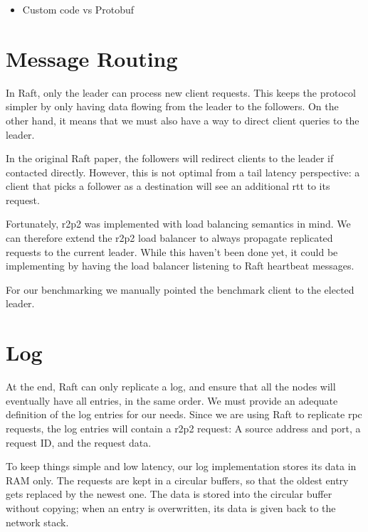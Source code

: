 
\begin{itemize}
    \item Custom code vs Protobuf
\end{itemize}



\section{Message Routing}

In Raft, only the leader can process new client requests.
This keeps the protocol simpler by only having data flowing from the leader to the followers.
On the other hand, it means that we must also have a way to direct client queries to the leader.

In the original Raft paper\cite{raft}, the followers will redirect clients to the leader if contacted directly.
However, this is not optimal from a tail latency perspective: a client that picks a follower as a destination will see an additional \gls{rtt} to its request.

Fortunately, \gls{r2p2} was implemented with load balancing semantics in mind.
We can therefore extend the \gls{r2p2} load balancer to always propagate replicated requests to the current leader.
While this haven't been done yet, it could be implementing by having the load balancer listening to Raft heartbeat messages.

For our benchmarking we manually pointed the benchmark client to the elected leader.

\section{Log}

At the end, Raft can only replicate a log, and ensure that all the nodes will eventually have all entries, in the same order.
We must provide an adequate definition of the log entries for our needs.
Since we are using Raft to replicate \gls{rpc} requests, the log entries will contain a \gls{r2p2} request: A source address and port, a request ID, and the request data.

To keep things simple and low latency, our log implementation stores its data in RAM only.
The requests are kept in a circular buffers, so that the oldest entry gets replaced by the newest one.
The data is stored into the circular buffer without copying; when an entry is overwritten, its data is given back to the network stack.

